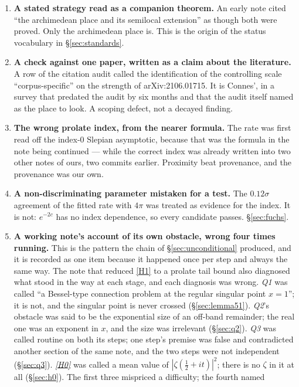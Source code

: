 \documentclass[11pt,a4paper]{article}
\theoremstyle{plain}
\theoremstyle{definition}
\theoremstyle{remark}
\begin{document}
\begin{enumerate}\itemsep3pt
\item \textbf{A stated strategy read as a companion theorem.}  An early note
cited ``the archimedean place and its semilocal extension'' as though both were
proved.  Only the archimedean place is.  This is the origin of the status
vocabulary in \S\ref{sec:standards}.
\item \textbf{A check against one paper, written as a claim about the
literature.}  A row of the citation audit called the identification of the
controlling scale ``corpus-specific'' on the strength of arXiv:2106.01715.  It is
Connes', in a survey that predated the audit by six months and that the audit
itself named as the place to look.  A scoping defect, not a decayed finding.
\item \textbf{The wrong prolate index, from the nearer formula.}  The rate was
first read off the index-0 Slepian asymptotic, because that was the formula in
the note being continued --- while the correct index was already written into two
other notes of ours, two commits earlier.  Proximity beat provenance, and the
provenance was our own.
\item \textbf{A non-discriminating parameter mistaken for a test.}  The
$0.12\sigma$ agreement of the fitted rate with $4\pi$ was treated as evidence for
the index.  It is not: $e^{-2c}$ has no index dependence, so every candidate
passes.  \S\ref{sec:fuchs}.
\item \textbf{A working note's account of its own obstacle, wrong four times
running.}  This is the pattern the chain of \S\ref{sec:unconditional} produced,
and it is recorded as one item because it happened once per step and always the
same way.  The note that reduced \eqref{H1} to a prolate tail bound also
diagnosed what stood in the way at each stage, and each diagnosis was wrong.
\emph{Q1} was called ``a Bessel-type connection problem at the regular singular
point $x=1$''; it is not, and the singular point is never crossed
(\S\ref{sec:lemma51}).  \emph{Q2}'s obstacle was said to be the exponential size
of an off-band remainder; the real one was an exponent in $x$, and the size was
irrelevant (\S\ref{sec:q2}).  \emph{Q3} was called routine on both its steps;
one step's premise was false and contradicted another section of the same note,
and the two steps were not independent (\S\ref{sec:q3}).  \emph{\eqref{H0}} was
called a mean value of $|\zeta(\tfrac12+it)|^2$; there is no $\zeta$ in it at
all (\S\ref{sec:h0}).  The first three mispriced a difficulty; the fourth named

\end{enumerate}
\end{document}
